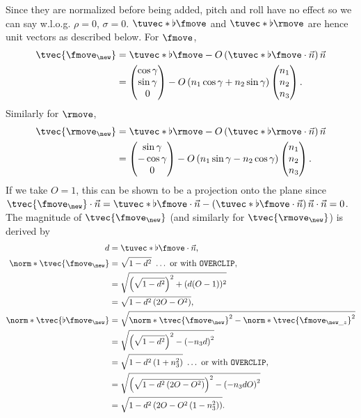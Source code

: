 Since they are normalized before being added, pitch and roll have no effect so we can say w.l.o.g. $\rho = 0$, $\sigma = 0$. $\tuvec*{\flat{\fmove}}$ and $\tuvec*{\flat{\rmove}}$ are hence unit vectors as described below.
For $\fmove$,
\begin{align*}
\tvec{\fmove_{\new}} &= \tuvec*{\flat{\fmove}} - O\left(\tuvec*{\flat{\fmove}}\cdot \vec{n} \right)\vec{n}\\
&= \begin{pmatrix}
\cos\gamma \\ \sin\gamma \\ 0
\end{pmatrix} - O\left(n_1\cos\gamma + n_2\sin\gamma \right) \begin{pmatrix}
n_1 \\ n_2 \\ n_3
\end{pmatrix}.
\end{align*}
Similarly for $\rmove$,
\begin{align*}
\tvec{\rmove_{\new}} &= \tuvec*{\flat{\rmove}} - O\left(\tuvec*{\flat{\rmove}}\cdot \vec{n} \right)\vec{n}\\
&= \begin{pmatrix}
\sin\gamma \\ -\cos\gamma \\ 0
\end{pmatrix} - O\left(n_1\sin\gamma - n_2\cos\gamma \right) \begin{pmatrix}
n_1 \\ n_2 \\ n_3
\end{pmatrix}.
\end{align*}
If we take $O = 1$, this can be shown to be a projection onto the plane since $\tvec{\fmove_{\new}}\cdot \vec{n} = \tuvec*{\flat{\fmove}}\cdot \vec{n} - \left(\tuvec*{\flat{\fmove}}\cdot \vec{n} \right)\vec{n}\cdot \vec{n} = 0$.\\
The magnitude of $\tvec{\fmove_{\new}}$ (and similarly for $\tvec{\rmove_{\new}}$) is derived by
\begin{align*}
d &= \tuvec*{\flat{\fmove}}\cdot \vec{n},\\
\norm*{\tvec{\fmove_{\new}}} &= \sqrt{1 - d^2}\ \ldots\ \text{or with \texttt{OVERCLIP}},\\
&= \sqrt{\left(\sqrt{1 - d^2} \right)^2 + (d(O - 1))^2}\\
&= \sqrt{1 - d^2 \left(2O - O^2 \right)},\\
\norm*{\tvec{\flat{\fmove_{\new}}}} &= \sqrt{\norm*{\tvec{\fmove_{\new}}}^2 - \norm*{\tvec{\fmove_{\new\_z}}}^2}\\
&= \sqrt{\left(\sqrt{1 - d^2} \right)^2 - \left(-n_3 d \right)^2}\\
&= \sqrt{1 - d^2 \left(1 + n_3^2 \right)}\ \ldots\ \text{or with \texttt{OVERCLIP}},\\
&= \sqrt{\left(\sqrt{1 - d^2 \left(2O - O^2 \right)} \right)^2 - \left(-n_3 dO \right)^2}\\
&= \sqrt{1 - d^2 \left(2O - O^2 \left(1 - n_3^2 \right) \right)}.
\end{align*}
